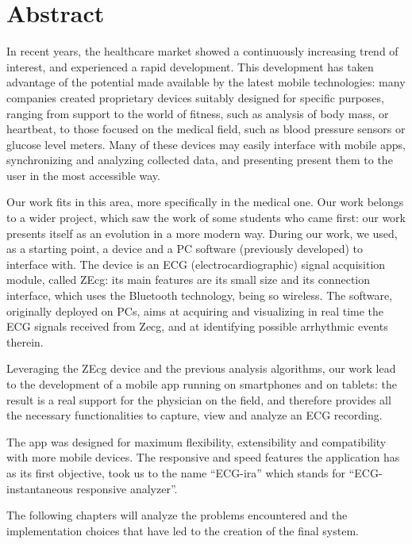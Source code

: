 \chapter{Abstract}

In recent years, the healthcare market showed a continuously increasing trend of interest, and experienced a rapid development. This development has taken advantage of the potential made available by the latest mobile technologies: many companies created proprietary devices suitably designed for specific purposes, ranging from support to the world of fitness, such as analysis of body mass, or heartbeat, to those focused on the medical field, such as blood pressure sensors or glucose level meters. Many of these devices may easily interface with mobile apps, synchronizing and analyzing collected data, and presenting present them to the user in the most accessible way.

Our work fits in this area, more specifically in the medical one. Our work belongs to a wider project, which saw the work of some students who came first: our work presents itself as an evolution in a more modern way. During our work, we used, as a starting point, a device and a PC software (previously developed) to interface with. The device is an ECG (electrocardiographic) signal acquisition module, called ZEcg: its main features are its small size and its connection interface, which uses the Bluetooth technology, being so wireless.  The software, originally deployed on PCs, aims at acquiring and visualizing in real time the ECG signals received from Zecg, and at identifying possible arrhythmic events therein.

Leveraging the ZEcg device and the previous analysis algorithms, our work lead to the development of a mobile app running on smartphones and on tablets: the result is a real support for the physician on the field, and therefore provides all the necessary functionalities to capture, view and analyze an ECG recording.

The app was designed for maximum flexibility, extensibility and compatibility with more mobile devices. The responsive and speed features the application has as its first objective, took us to the name ``ECG-ira'' which stands for ``ECG-instantaneous responsive analyzer''.

The following chapters will analyze the problems encountered and the implementation choices that have led to the creation of the final system.

